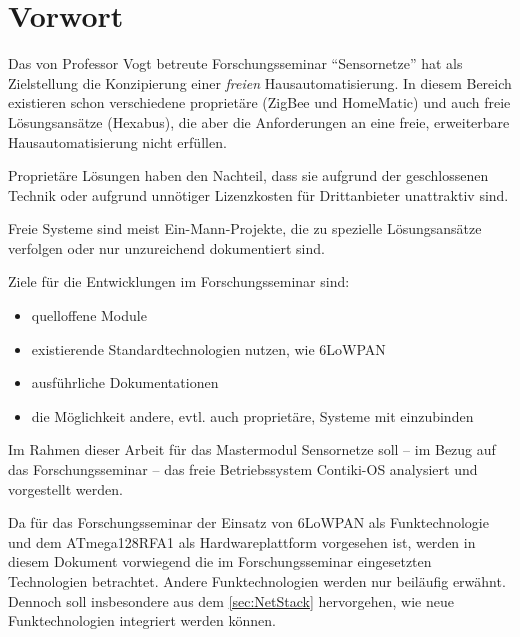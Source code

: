 \chapter*{Vorwort}
	Das von Professor Vogt betreute Forschungsseminar \enquote{Sensornetze}
	hat als Zielstellung die Konzipierung einer \emph{freien}
	Hausautomatisierung.  In diesem Bereich existieren schon verschiedene
	proprietäre (\zB ZigBee und HomeMatic) und auch freie Lösungsansätze
	(\zB Hexabus), die aber die Anforderungen an eine freie,
	erweiterbare Hausautomatisierung nicht erfüllen.

	\medskip

	Proprietäre Lösungen haben den Nachteil, dass sie aufgrund
	der geschlossenen Technik oder aufgrund unnötiger Lizenzkosten
	für Drittanbieter unattraktiv sind.
	
	Freie Systeme sind meist Ein-Mann-Projekte, die zu spezielle
	Lösungsansätze verfolgen oder nur unzureichend dokumentiert sind.

	\medskip

	Ziele für die Entwicklungen im Forschungsseminar sind:
	\begin{itemize}
	\item	quelloffene Module
	\item	existierende Standardtechnologien nutzen, wie \acf{6LoWPAN}
	\item	ausführliche Dokumentationen
	\item	die Möglichkeit andere, evtl. auch proprietäre, Systeme
		mit einzubinden
	\end{itemize}

	\medskip

	Im Rahmen dieser Arbeit für das Mastermodul Sensornetze soll -- im
	Bezug auf das Forschungsseminar --  das freie Betriebssystem Contiki-OS
	analysiert und vorgestellt werden.

	Da für das Forschungsseminar der Einsatz von \acs{6LoWPAN} als
	Funktechnologie und dem
	ATmega128RFA1 als Hardwareplattform vorgesehen ist, werden in diesem
	Dokument vorwiegend die im Forschungsseminar eingesetzten Technologien
	betrachtet. Andere Funktechnologien werden nur beiläufig erwähnt.
	Dennoch soll insbesondere aus dem \autoref{sec:NetStack} hervorgehen,
	wie neue Funktechnologien integriert werden können.

